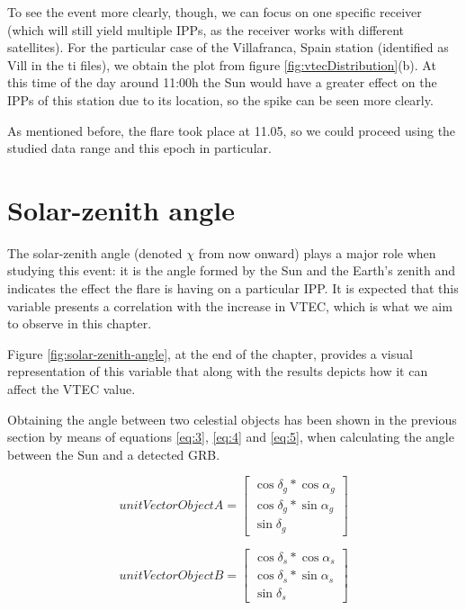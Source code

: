 To see the event more clearly, though, we can focus on one specific receiver (which will still yield multiple IPPs, as the receiver works with different satellites). For the particular case of the Villafranca, Spain station (identified as Vill in the ti files), we obtain the plot from figure \ref{fig:vtecDistribution}(b). At this time of the day around 11:00h the Sun would have a greater effect on the IPPs of this station due to its location, so the spike can be seen more clearly. 

As mentioned before, the flare took place at 11.05, so we could proceed using the studied data range and this epoch in particular.

\section{Solar-zenith angle}

The solar-zenith angle (denoted $\chi$ from now onward) plays a major role when studying this event: it is the angle formed by the Sun and the Earth's zenith and indicates the effect the flare is having on a particular IPP. It is expected that this variable presents a correlation with the increase in VTEC, which is what we aim to observe in this chapter.

Figure \ref{fig:solar-zenith-angle}, at the end of the chapter, provides a visual representation of this variable that along with the results depicts how it can affect the VTEC value. 

Obtaining the angle between two celestial objects has been shown in the previous section by means of equations \ref{eq:3}, \ref{eq:4} and \ref{eq:5}, when calculating the angle between the Sun and a detected GRB.

\begin{equation} \label{eq:3}
unitVectorObjectA =	
\begin{bmatrix}
\cos\delta_{g} * \cos\alpha_{g} \\ 
\cos\delta_{g} * \sin\alpha_{g} \\
\sin\delta_{g}
\end{bmatrix}
\end{equation}

\begin{equation} \label{eq:4}
unitVectorObjectB =	
\begin{bmatrix}
\cos\delta_{s} * \cos\alpha_{s} \\ 
\cos\delta_{s} * \sin\alpha_{s} \\
\sin\delta_{s}
\end{bmatrix}
\end{equation}

